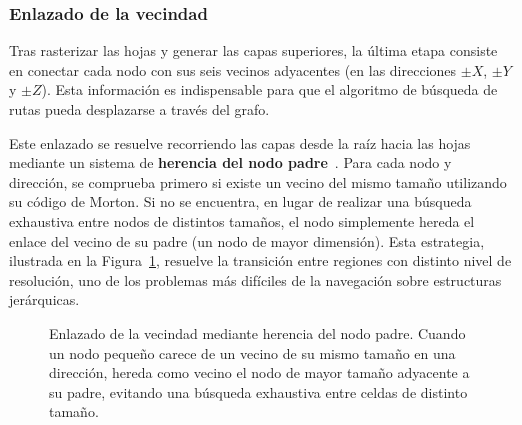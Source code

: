 \subsubsection{Enlazado de la vecindad}
\label{sec:enlazado-vecinos}

Tras rasterizar las hojas y generar las capas superiores, la última etapa consiste en conectar cada nodo con sus seis vecinos adyacentes (en las direcciones $\pm X$, $\pm Y$ y $\pm Z$).
Esta información es indispensable para que el algoritmo de búsqueda de rutas pueda desplazarse a través del grafo.

Este enlazado se resuelve recorriendo las capas desde la raíz hacia las hojas mediante un sistema de \textbf{herencia del nodo padre}~\cite{brewer20193d}.
Para cada nodo y dirección, se comprueba primero si existe un vecino del mismo tamaño utilizando su código de Morton.
Si no se encuentra, en lugar de realizar una búsqueda exhaustiva entre nodos de distintos tamaños, el nodo simplemente hereda el enlace del vecino de su padre (un nodo de mayor dimensión).
Esta estrategia, ilustrada en la Figura~\ref{fig:neighbor-link}, resuelve la transición entre regiones con distinto nivel de resolución, uno de los problemas más difíciles de la navegación sobre estructuras jerárquicas.

\begin{figure}[htp]
  \centering
  \caption[Enlazado de la vecindad mediante herencia del nodo padre.]
  {Enlazado de la vecindad mediante herencia del nodo padre.
  Cuando un nodo pequeño carece de un vecino de su mismo tamaño en una dirección, hereda como vecino el nodo de mayor tamaño adyacente a su padre, evitando una búsqueda exhaustiva entre celdas de distinto tamaño.}
  \label{fig:neighbor-link}
\end{figure}

